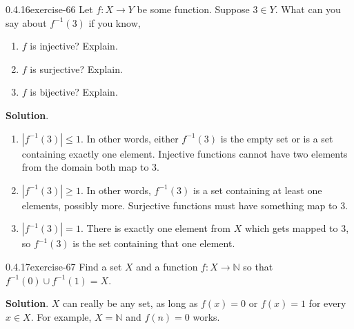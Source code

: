 \documentclass[twoside,11pt,]{book}
\numberwithin{equation}{chapter}
\newcommand{\N}{\mathbb N}
\newcommand{\inv}{^{-1}}
\begin{document}
\begin{divisionsolution}{0.4.16}{}{exercise-66}%
\hypertarget{p-1098}{}%
Let \(f:X \to Y\) be some function. Suppose \(3 \in Y\). What can you say about \(f\inv(3)\) if you know,\leavevmode%
\begin{enumerate}[label=(\alph*)]
\item\hypertarget{li-885}{}\hypertarget{p-1099}{}%
\(f\) is injective? Explain.%
\item\hypertarget{li-886}{}\hypertarget{p-1100}{}%
\(f\) is surjective? Explain.%
\item\hypertarget{li-887}{}\hypertarget{p-1101}{}%
\(f\) is bijective? Explain.%
\end{enumerate}
%
\par\smallskip%
\noindent\textbf{Solution}.\quad%
\hypertarget{p-1102}{}%
\leavevmode%
\begin{enumerate}[label=(\alph*)]
\item\hypertarget{li-888}{}\hypertarget{p-1103}{}%
\(|f\inv(3)| \le 1\). In other words, either \(f\inv(3)\) is the empty set or is a set containing exactly one element. Injective functions cannot have two elements from the domain both map to 3.%
\item\hypertarget{li-889}{}\hypertarget{p-1104}{}%
\(|f\inv(3)| \ge 1\). In other words, \(f\inv(3)\) is a set containing at least one elements, possibly more. Surjective functions must have something map to 3.%
\item\hypertarget{li-890}{}\hypertarget{p-1105}{}%
\(|f\inv(3)| = 1\). There is exactly one element from \(X\) which gets mapped to 3, so \(f\inv(3)\) is the set containing that one element.%
\end{enumerate}
%
\end{divisionsolution}%
\begin{divisionsolution}{0.4.17}{}{exercise-67}%
\hypertarget{p-1106}{}%
Find a set \(X\) and a function \(f:X \to \N\) so that \(f\inv(0) \cup f\inv(1) = X\).%
\par\smallskip%
\noindent\textbf{Solution}.\quad%
\hypertarget{p-1107}{}%
\(X\) can really be any set, as long as \(f(x) = 0\) or \(f(x) = 1\) for every \(x \in X\). For example, \(X = \N\) and \(f(n) = 0\) works.%
\end{divisionsolution}%
\end{document}
